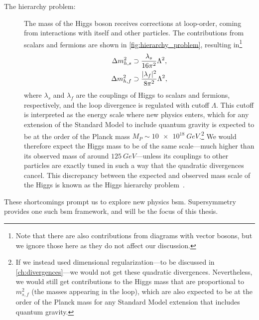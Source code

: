 \begin{description}
    \item[The hierarchy problem:]
    The mass of the Higgs boson receives corrections at loop-order, coming from interactions with itself and other particles. The contributions from scalars and fermions are shown in \cref{fig:hierarchy_problem}, resulting in\footnote{Note that there are also contributions from diagrams with vector bosons, but we ignore those here as they do not affect our discussion.}\cite{Martin:1997ns}
    \begin{subequations}
    \label{eq:hierarchy_problem}
    \begin{align}
        \Delta m_{h,s}^2 &\supset \frac{\lambda_s}{16\pi^2} \Lambda^2,
        \\
        \Delta m_{h,f}^2 &\supset \frac{\lvert\lambda_f\rvert^2}{8\pi^2} \Lambda^2,
    \end{align}
    \end{subequations}
    where $\lambda_s$ and $\lambda_f$ are the couplings of Higgs to scalars and fermions, respectively, and the loop divergence is regulated with  cutoff $\Lambda$.
    This cutoff is interpreted as the energy scale where new physics enters, which for any extension of the Standard Model to include quantum gravity is expected to be at the order of the Planck mass $M_P\sim\qty{10e18}{GeV}$.\footnote{If we instead used dimensional regularization---to be discussed in \cref{ch:divergences}---we would not get these quadratic divergences. Nevertheless, we would still get contributions to the Higgs mass that are proportional to $m_{s,f}^2$ (the masses appearing in the loop), which are also expected to be at the order of the Planck mass for any Standard Model extension that includes quantum gravity.}
    We would therefore expect the Higgs mass to be of the same scale---much higher than its observed mass of around $\qty{125}{GeV}$---unless its couplings to other particles are exactly tuned in such a way that the quadratic divergences cancel.
    This discrepancy between the expected and observed mass scale of the Higgs is known as the Higgs hierarchy problem~\cite{Peskin:2025lsg}.
\end{description}
These shortcomings prompt us to explore new physics \acrfull{bsm}.
Supersymmetry provides one such \gls{bsm} framework, and will be the focus of this thesis.


